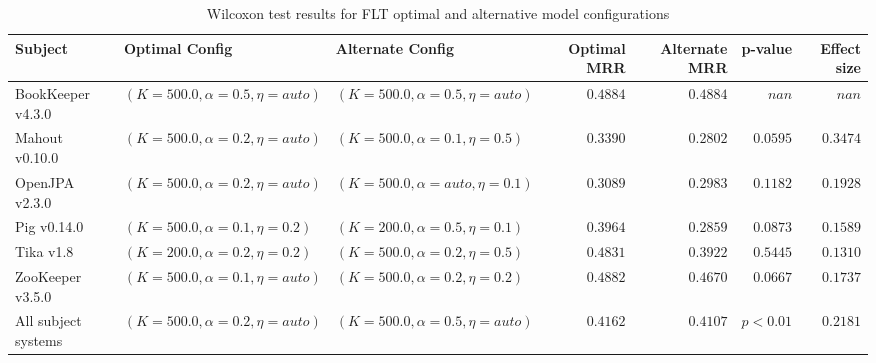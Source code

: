 
\begin{table}
\begin{spacing}{1.2}
\centering
\caption{Wilcoxon test results for FLT optimal and alternative model configurations}
\label{table:combo-flt-model-sweep-wilcox}
\begin{tabular}{lllrrrr}
\toprule
                      Subject &                      Optimal Config &                    Alternate Config & Optimal MRR & Alternate MRR &  p-value & Effect size \\
\midrule
            BookKeeper v4.3.0 &  $(K=500.0, \alpha=0.5, \eta=auto)$ &  $(K=500.0, \alpha=0.5, \eta=auto)$ &    $0.4884$ &      $0.4884$ &    $nan$ &       $nan$ \\
               Mahout v0.10.0 &  $(K=500.0, \alpha=0.2, \eta=auto)$ &   $(K=500.0, \alpha=0.1, \eta=0.5)$ &    $0.3390$ &      $0.2802$ & $0.0595$ &    $0.3474$ \\
               OpenJPA v2.3.0 &  $(K=500.0, \alpha=0.2, \eta=auto)$ &  $(K=500.0, \alpha=auto, \eta=0.1)$ &    $0.3089$ &      $0.2983$ & $0.1182$ &    $0.1928$ \\
                  Pig v0.14.0 &   $(K=500.0, \alpha=0.1, \eta=0.2)$ &   $(K=200.0, \alpha=0.5, \eta=0.1)$ &    $0.3964$ &      $0.2859$ & $0.0873$ &    $0.1589$ \\
                    Tika v1.8 &   $(K=200.0, \alpha=0.2, \eta=0.2)$ &   $(K=500.0, \alpha=0.2, \eta=0.5)$ &    $0.4831$ &      $0.3922$ & $0.5445$ &    $0.1310$ \\
             ZooKeeper v3.5.0 &  $(K=500.0, \alpha=0.1, \eta=auto)$ &   $(K=500.0, \alpha=0.2, \eta=0.2)$ &    $0.4882$ &      $0.4670$ & $0.0667$ &    $0.1737$ \\
 \midrule
All subject systems &  $(K=500.0, \alpha=0.2, \eta=auto)$ &  $(K=500.0, \alpha=0.5, \eta=auto)$ &    $0.4162$ &      $0.4107$ & $p<0.01$ &    $0.2181$ \\
\bottomrule
\end{tabular}

\end{spacing}
\end{table}

